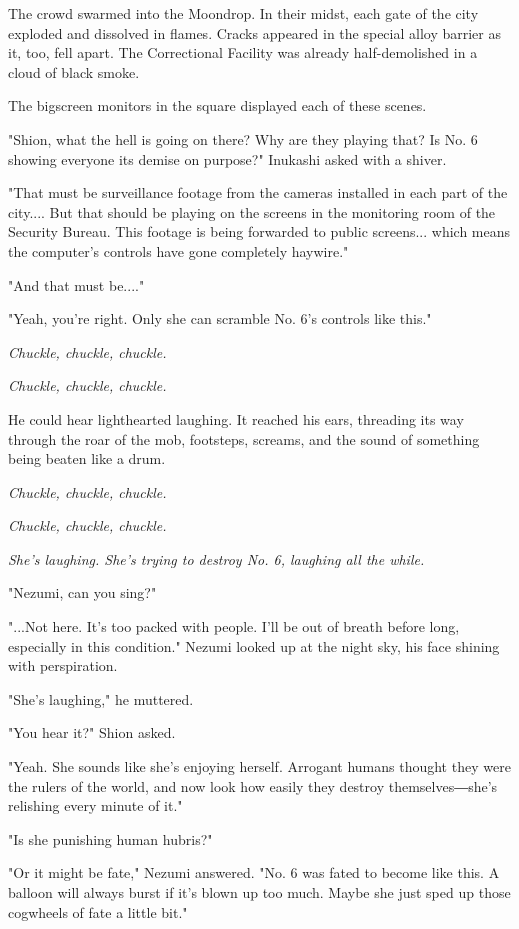 The crowd swarmed into the Moondrop. In their midst, each gate of the
city exploded and dissolved in flames. Cracks appeared in the special
alloy barrier as it, too, fell apart. The Correctional Facility was
already half-demolished in a cloud of black smoke.

The bigscreen monitors in the square displayed each of these scenes.

"Shion, what the hell is going on there? Why are they playing that? Is
No. 6 showing everyone its demise on purpose?" Inukashi asked with a
shiver.

"That must be surveillance footage from the cameras installed in each
part of the city.... But that should be playing on the screens in the
monitoring room of the Security Bureau. This footage is being forwarded
to public screens... which means the computer's controls have gone
completely haywire."

"And that must be...."

"Yeah, you're right. Only she can scramble No. 6's controls like this."

\emph{Chuckle, chuckle, chuckle.}

\emph{Chuckle, chuckle, chuckle.}

He could hear lighthearted laughing. It reached his ears, threading its
way through the roar of the mob, footsteps, screams, and the sound of
something being beaten like a drum.

\emph{Chuckle, chuckle, chuckle.}

\emph{Chuckle, chuckle, chuckle.}

\myspace

\emph{She's laughing. She's trying to destroy No. 6, laughing all the while.}

"Nezumi, can you sing?"

"...Not here. It's too packed with people. I'll be out of breath before
long, especially in this condition." Nezumi looked up at the night sky,
his face shining with perspiration.

"She's laughing," he muttered.

"You hear it?" Shion asked.

"Yeah. She sounds like she's enjoying herself. Arrogant humans thought
they were the rulers of the world, and now look how easily they destroy
themselves―she's relishing every minute of it."

"Is she punishing human hubris?"

"Or it might be fate," Nezumi answered. "No. 6 was fated to become like
this. A balloon will always burst if it's blown up too much. Maybe she
just sped up those cogwheels of fate a little bit."

